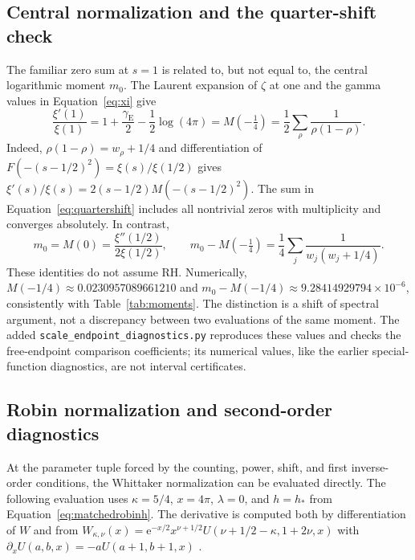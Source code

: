 \documentclass[11pt,letterpaper]{article}
\numberwithin{equation}{section}
\theoremstyle{definition}
\theoremstyle{remark}
\newcommand{\e}{\mathrm e}
\begin{document}
\subsection{Central normalization and the quarter-shift check}
\label{subsec:quartershift}
The familiar zero sum at $s=1$ is related to, but not equal to, the central logarithmic moment $m_0$. The Laurent expansion of $\zeta$ at one and the gamma values in Equation~\eqref{eq:xi} give \cite{titchmarsh,dlmf}
\begin{equation}
 \frac{\xi'(1)}{\xi(1)}
 =1+\frac{\gamma_{\mathrm E}}2-\frac12\log(4\pi)
 =M(-\tfrac14)
 =\frac12\sum_\rho\frac1{\rho(1-\rho)}.
 \label{eq:quartershift}
\end{equation}
Indeed, $\rho(1-\rho)=w_\rho+1/4$ and differentiation of
$F(-(s-1/2)^2)=\xi(s)/\xi(1/2)$ gives
$\xi'(s)/\xi(s)=2(s-1/2)M(-(s-1/2)^2)$. The sum in Equation~\eqref{eq:quartershift} includes all nontrivial zeros with multiplicity and converges absolutely. In contrast,
\begin{equation}
 m_0=M(0)=\frac{\xi''(1/2)}{2\xi(1/2)},\qquad
 m_0-M(-\tfrac14)
 =\frac14\sum_j\frac1{w_j(w_j+1/4)}.
 \label{eq:quartershiftdifference}
\end{equation}
These identities do not assume RH. Numerically,
$M(-1/4)\approx0.0230957089661210$ and
$m_0-M(-1/4)\approx9.28414929794\times10^{-6}$, consistently with Table~\ref{tab:moments}. The distinction is a shift of spectral argument, not a discrepancy between two evaluations of the same moment. The added \texttt{scale\_endpoint\_diagnostics.py} reproduces these values and checks the free-endpoint comparison coefficients; its numerical values, like the earlier special-function diagnostics, are not interval certificates.


\subsection{Robin normalization and second-order diagnostics}
\label{subsec:robindiagnostics}
At the parameter tuple forced by the counting, power, shift, and first inverse-order conditions, the Whittaker normalization can be evaluated directly. The following evaluation uses $\kappa=5/4$, $x=4\pi$, $\lambda=0$, and $h=h_*$ from Equation~\eqref{eq:matchedrobinh}. The derivative is computed both by differentiation of $W$ and from
$W_{\kappa,\nu}(x)=\e^{-x/2}x^{\nu+1/2}U(\nu+1/2-\kappa,1+2\nu,x)$ with $\partial_xU(a,b,x)=-aU(a+1,b+1,x)$ \cite[Sections~13.3 and 13.14]{dlmf}.
\end{document}
